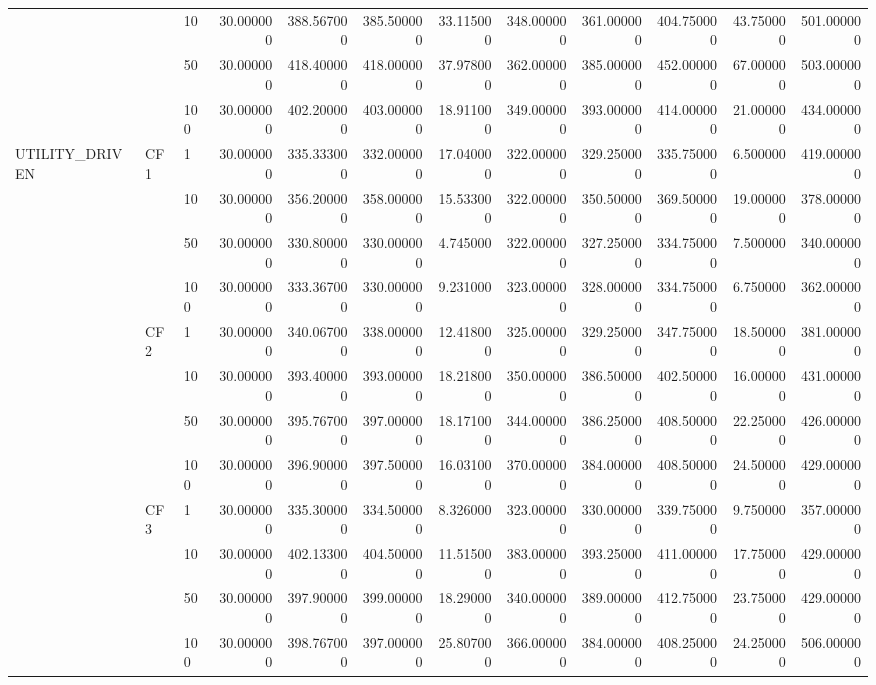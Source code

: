 \begin{tabular}{lllrrrrrrrrr}
 &  & 10 & 30.000000 & 388.567000 & 385.500000 & 33.115000 & 348.000000 & 361.000000 & 404.750000 & 43.750000 & 501.000000 \\
 &  & 50 & 30.000000 & 418.400000 & 418.000000 & 37.978000 & 362.000000 & 385.000000 & 452.000000 & 67.000000 & 503.000000 \\
 &  & 100 & 30.000000 & 402.200000 & 403.000000 & 18.911000 & 349.000000 & 393.000000 & 414.000000 & 21.000000 & 434.000000 \\
\cline{1-12} \cline{2-12}
\multirow[t]{16}{*}{UTILITY_DRIVEN} & \multirow[t]{4}{*}{CF1} & 1 & 30.000000 & 335.333000 & 332.000000 & 17.040000 & 322.000000 & 329.250000 & 335.750000 & 6.500000 & 419.000000 \\
 &  & 10 & 30.000000 & 356.200000 & 358.000000 & 15.533000 & 322.000000 & 350.500000 & 369.500000 & 19.000000 & 378.000000 \\
 &  & 50 & 30.000000 & 330.800000 & 330.000000 & 4.745000 & 322.000000 & 327.250000 & 334.750000 & 7.500000 & 340.000000 \\
 &  & 100 & 30.000000 & 333.367000 & 330.000000 & 9.231000 & 323.000000 & 328.000000 & 334.750000 & 6.750000 & 362.000000 \\
\cline{2-12}
 & \multirow[t]{4}{*}{CF2} & 1 & 30.000000 & 340.067000 & 338.000000 & 12.418000 & 325.000000 & 329.250000 & 347.750000 & 18.500000 & 381.000000 \\
 &  & 10 & 30.000000 & 393.400000 & 393.000000 & 18.218000 & 350.000000 & 386.500000 & 402.500000 & 16.000000 & 431.000000 \\
 &  & 50 & 30.000000 & 395.767000 & 397.000000 & 18.171000 & 344.000000 & 386.250000 & 408.500000 & 22.250000 & 426.000000 \\
 &  & 100 & 30.000000 & 396.900000 & 397.500000 & 16.031000 & 370.000000 & 384.000000 & 408.500000 & 24.500000 & 429.000000 \\
\cline{2-12}
 & \multirow[t]{4}{*}{CF3} & 1 & 30.000000 & 335.300000 & 334.500000 & 8.326000 & 323.000000 & 330.000000 & 339.750000 & 9.750000 & 357.000000 \\
 &  & 10 & 30.000000 & 402.133000 & 404.500000 & 11.515000 & 383.000000 & 393.250000 & 411.000000 & 17.750000 & 429.000000 \\
 &  & 50 & 30.000000 & 397.900000 & 399.000000 & 18.290000 & 340.000000 & 389.000000 & 412.750000 & 23.750000 & 429.000000 \\
 &  & 100 & 30.000000 & 398.767000 & 397.000000 & 25.807000 & 366.000000 & 384.000000 & 408.250000 & 24.250000 & 506.000000 \\

\end{tabular}
